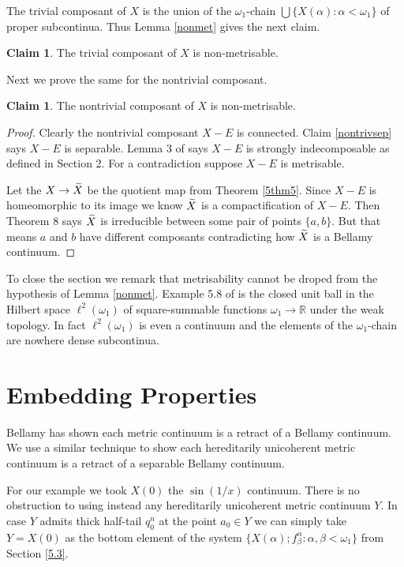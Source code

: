 \documentclass[12pt]{article}
\theoremstyle{plain}
\theoremstyle{definition}
\newcounter{claim5counter}
\newtheorem{claim5}[claim5counter]{Claim}
\newcommand{\A}{\ensuremath{\alpha}}
\newcommand{\B}{\ensuremath{\beta}}
\newcommand{\W}{\ensuremath{\omega}}
\newcommand{\0}{\ensuremath{\varnothing}}
\newcommand{\wt}{\ensuremath{\widetilde}}
\begin{document}
	The trivial composant of $X$ is the union of the $\W_1$-chain $\bigcup \{X(\A): \A < \W_1 \}$ of proper subcontinua.
	Thus Lemma \ref{nonmet} gives the next claim.
	
	\begin{claim5}
		The trivial composant of $X$ is non-metrisable.
	\end{claim5}
	
	Next we prove the same for the nontrivial composant.
	
	\begin{claim5}
		The nontrivial composant of $X$ is non-metrisable.
	\end{claim5}
	
	\begin{proof}
		Clearly the nontrivial composant $X-E$ is connected.
		Claim \ref{nontrivsep} says $X-E$ is separable.
		Lemma 3 of \cite{Lipham01} says $X-E$ is strongly indecomposable as defined in \cite{Lipham01} Section 2.
		For a contradiction suppose $X-E$ is metrisable.
		
		Let the $X \to \wt X$ be the quotient map from Theorem \ref{5thm5}.
		Since $X-E$ is homeomorphic to its image we know $\wt X$ is a compactification of $X-E$.
		Then \cite{Lipham01} Theorem 8  says $\wt X$ is irreducible between some pair of points $\{a,b\}$.
		But that means $a$ and $b$ have different composants contradicting how $\wt X$ is a Bellamy continuum.
	\end{proof}
	
	To close the section we remark that metrisability cannot be droped from the hypothesis of Lemma \ref{nonmet}.
	Example 5.8 of \cite{me1} is the closed unit ball in the Hilbert space $\ell^2(\W_1)$ 
	of square-summable functions $\W_1 \to \mathbb R$ under the weak topology. 
	In fact $\ell^2(\W_1)$ is even a continuum and the elements of the $\W_1$-chain are nowhere dense subcontinua.
	
	\section{Embedding Properties}
	
	\noindent
	Bellamy \cite{one} has shown each metric continuum is a retract of a Bellamy continuum.
	We use a similar technique to show each hereditarily unicoherent metric continuum is a retract of a separable Bellamy continuum.
	
	For our example we took $X(0)$ the $\sin(1/x)$ continuum. There is no obstruction to using instead any hereditarily unicoherent metric continuum $Y$.
	In case $Y$ admits thick half-tail $q^n_0$ at the point \mbox{$a_0 \in Y$} we can simply take $Y = X(0)$ as the bottom element of the system $\{X(\A);f^\A_\B: \A,\B< \W_1\}$ from Section \ref{5.3}.
	
\end{document}
